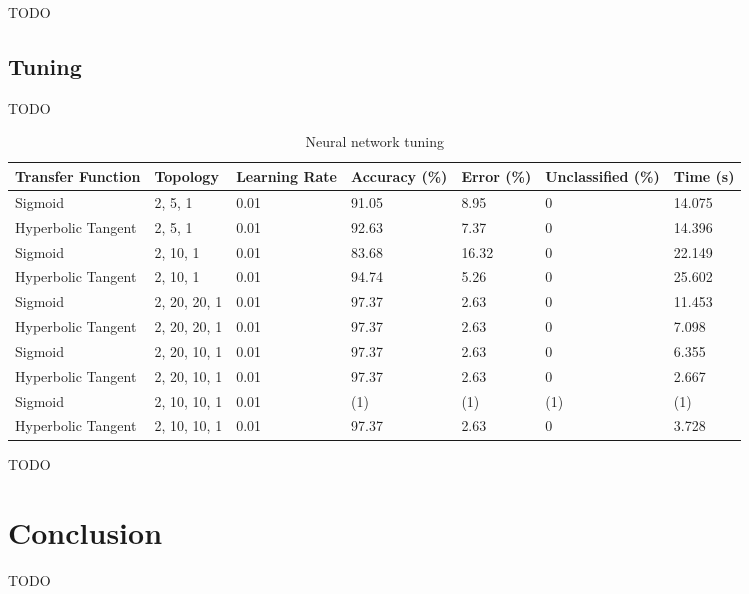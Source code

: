 \documentclass[a4paper]{article}
\begin{document}
TODO

\subsection{Tuning}

TODO

\begin{table}[]
  \centering
  \begin{tabular}{@{}llllll@{}}
    \toprule
    Transfer Function  & Topology     & Learning Rate & Accuracy (\%) & Error (\%) & Unclassified (\%) & Time (s) \\
    \midrule
    Sigmoid            & 2, 5, 1      & 0.01          & 91.05         & 8.95       & 0                 & 14.075   \\
    Hyperbolic Tangent & 2, 5, 1      & 0.01          & 92.63         & 7.37       & 0                 & 14.396   \\
    Sigmoid            & 2, 10, 1     & 0.01          & 83.68         & 16.32      & 0                 & 22.149   \\
    Hyperbolic Tangent & 2, 10, 1     & 0.01          & 94.74         & 5.26       & 0                 & 25.602   \\
    Sigmoid            & 2, 20, 20, 1 & 0.01          & 97.37         & 2.63       & 0                 & 11.453   \\
    Hyperbolic Tangent & 2, 20, 20, 1 & 0.01          & 97.37         & 2.63       & 0                 & 7.098    \\
    Sigmoid            & 2, 20, 10, 1 & 0.01          & 97.37         & 2.63       & 0                 & 6.355    \\
    Hyperbolic Tangent & 2, 20, 10, 1 & 0.01          & 97.37         & 2.63       & 0                 & 2.667    \\
    Sigmoid            & 2, 10, 10, 1 & 0.01          & (1)           & (1)        & (1)               & (1)      \\
    Hyperbolic Tangent & 2, 10, 10, 1 & 0.01          & 97.37         & 2.63       & 0                 & 3.728    \\
    \bottomrule
  \end{tabular}
  \caption{Neural network tuning}
  \label{tab:nn_tuning}
\end{table}

TODO

\section{Conclusion}

TODO

\end{document}
